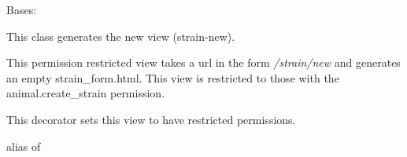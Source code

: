 \documentclass[letterpaper,10pt,english]{sphinxmanual}
\begin{document}
\begin{fulllineitems}
\label{api:mousedb.animal.views.StrainCreate}
Bases: \href{http://docs.djangoproject.com/en/dev/ref/class-based-views/\#django.views.generic.edit.CreateView}{}

This class generates the new {\hyperref[api:mousedb.animal.models.Strain]{}} view (strain-new).

This permission restricted view takes a url in the form \emph{/strain/new} and generates an empty strain\_form.html.
This view is restricted to those with the animal.create\_strain permission.

\begin{fulllineitems}
\label{api:mousedb.animal.views.StrainCreate.dispatch}
This decorator sets this view to have restricted permissions.

\end{fulllineitems}


\begin{fulllineitems}
\label{api:mousedb.animal.views.StrainCreate.model}
alias of 

\end{fulllineitems}


\begin{fulllineitems}
\label{api:mousedb.animal.views.StrainCreate.template_name}
\end{fulllineitems}


\end{fulllineitems}

\end{document}
